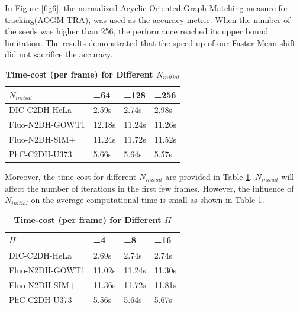 \documentclass[journal,twoside,web]{ieeecolor}
\begin{document}
In Figure \ref{fig6}, the normalized Acyclic Oriented Graph Matching measure for tracking(AOGM-TRA)\cite{b20},\cite{b39} was used as the accuracy metric. When the number of the seeds was higher than 256, the performance reached its upper bound limitation. The results demonstrated that the speed-up of our Faster Mean-shift did not sacrifice the accuracy.

\begin{table}[h]
\caption{\textbf{Time-cost (per frame) for Different $N_{initial}$}}
\setlength{\tabcolsep}{3pt}
\renewcommand\arraystretch{1.25}
\begin{tabular}{  p{3.25cm}<{\centering} p{1.5cm}<{\centering} p{1.5cm}<{\centering} p{1.5cm}<{\centering}}
\hline
\hline
$N_{initial}$ & =64 & =128 & =256\\
\hline
DIC-C2DH-HeLa & 2.59s & 2.74s & 2.98s\\
Fluo-N2DH-GOWT1 & 12.18s & 11.24s & 11.26s\\
Fluo-N2DH-SIM+ & 11.24s & 11.72s & 11.52s\\
PhC-C2DH-U373 & 5.66s & 5.64s & 5.57s\\
\hline
\hline
\end{tabular}
\label{tab3}
\end{table}

Moreover, the time cost for different $N_{initial}$ are provided in Table \ref{tab3}. $N_{initial}$ will affect the number of iterations in the first few frames. However, the influence of $N_{initial}$ on the average computational time is small as shown in Table \ref{tab3}. 

\begin{table}[h]
\caption{\textbf{Time-cost (per frame) for Different $H$}}
\setlength{\tabcolsep}{3pt}
\renewcommand\arraystretch{1.25}
\begin{tabular}{  p{3.25cm}<{\centering} p{1.5cm}<{\centering} p{1.5cm}<{\centering} p{1.5cm}<{\centering}}
\hline
\hline
$H$ & =4 & =8 & =16\\
\hline
DIC-C2DH-HeLa & 2.69s & 2.74s & 2.74s\\
Fluo-N2DH-GOWT1 & 11.02s & 11.24s & 11.30s\\
Fluo-N2DH-SIM+ & 11.36s & 11.72s & 11.81s\\
PhC-C2DH-U373 & 5.56s & 5.64s & 5.67s\\
\hline
\hline
\end{tabular}
\label{tab4}
\end{table}
\end{document}
